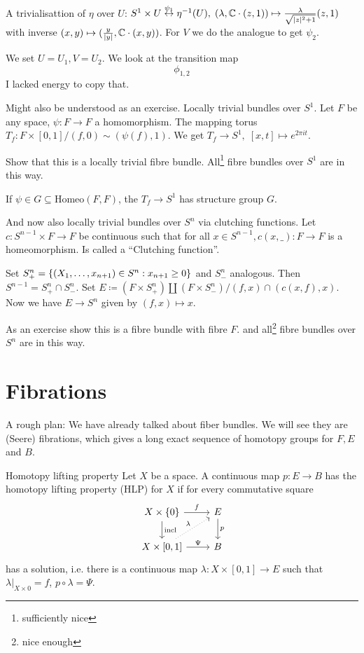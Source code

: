 \documentclass[language=english]{TemplateLecture}
\begin{document}
A trivialisattion of \(\eta\) over \(U\): \(S^1 \times U \overset{\psi_1}\leftrightarrow \eta^{-1}(U), \; (\lambda, \mathbb{C}\cdot(z,1)) \mapsto \frac{\lambda}{\sqrt{\lvert z\rvert ^2 +1}}(z,1)\) with inverse \((x,y) \mapsto (\frac{y}{\lvert y\rvert}, \mathbb{C} \cdot (x,y))\). For \(V\) we do the analogue to get \(\psi_2\).

We set \(U = U_1, V = U_2\). We look at the transition map
\[\phi_{1,2}\]
I lacked energy to copy that.

\begin{example}
    Might also be understood as an exercise. Locally trivial bundles over \(S^1\). Let \(F\) be any space, \(\psi\colon F \to F\) a homomorphism. The mapping torus \(T_f \colon F\times[0,1]/(f,0) \sim (\psi(f),1)\). We get \(T_f \to S^1, \; [x,t] \mapsto e^{2\pi it}\).

    Show that this is a locally trivial fibre bundle. All\footnote{sufficiently nice} fibre bundles over \(S^1\) are in this way.

    If \(\psi \in G \subseteq \mathrm{Homeo}(F,F)\), the \(T_f \to S^1\) has structure group \(G\).
    
    And now also locally trivial bundles over \(S^n\) via clutching functions. Let \(c\colon S^{n-1} \times F \to F\) be continuous such that for all \(x \in S^{n-1}, c(x, \_) \colon F \to F\) is a homeomorphism. Is called a \enquote{Clutching function}.

    Set \(S^n_+ = \{(X_1, \dots, x_{n+1}) \in S^n : x_{n+1} \geq 0\}\) and \(S^n_-\) analogous. Then \(S^{n-1} = S_+^n \cap S_-^n\). Set \(E \coloneq (F\times S_+^n) \amalg (F\times S_-^n)/(f,x) \cap (c(x,f),x)\). Now we have \(E \to S^n\) given by \((f,x) \mapsto x\).

    As an exercise show this is a fibre bundle with fibre \(F\). and all\footnote{nice enough} fibre bundles over \(S^n\) are in this way.
\end{example}



\section{Fibrations}

A rough plan: We have already talked about fiber bundles. We will see they are (Seere) fibrations, which gives a long exact sequence of homotopy groups for \(F, E\) and \(B\).

\begin{defi}{Homotopy lifting property}
    Let \(X\) be a space. A continuous map \(p\colon E \to B\) has the homotopy lifting property (HLP) for \(X\) if for every commutative square
    \[\begin{tikzcd}
        X \times \set 0 \ar[r, "f"] \ar[d, "\incl"] & E \ar[d, "p"]\\
        X \times [0,1] \ar[ru, dotted, "\lambda"] \ar[r, "\Psi"] & B
    \end{tikzcd}\]
    has a solution, i.e. there is a continuous map \(\lambda\colon X \times [0,1] \to E\) such that \(\lambda\rvert_{X \times {0}} = f\), \(p \circ \lambda = \Psi\).
\end{defi}
\end{document}
